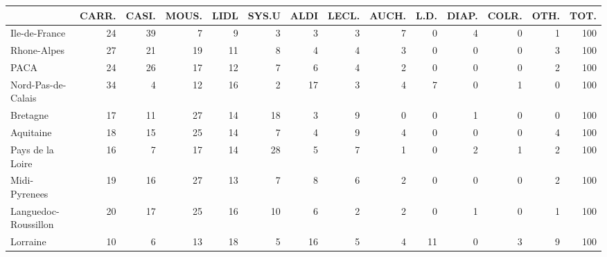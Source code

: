 \documentclass[11pt]{article}
\begin{document}
\begin{table}[H]
\begin{tabular}{lrrrrrrrrrrrrr}
\toprule
{} &      CARR. &      CASI. &      MOUS. &       LIDL &      SYS.U &       ALDI &      LECL. &      AUCH. &       L.D. &      DIAP. &      COLR. &       OTH. &       TOT. \\
\midrule
Ile-de-France        &         24 &         39 &          7 &          9 &          3 &          3 &          3 &          7 &          0 &          4 &          0 &          1 &        100 \\
Rhone-Alpes          &         27 &         21 &         19 &         11 &          8 &          4 &          4 &          3 &          0 &          0 &          0 &          3 &        100 \\
PACA                 &         24 &         26 &         17 &         12 &          7 &          6 &          4 &          2 &          0 &          0 &          0 &          2 &        100 \\
Nord-Pas-de-Calais   &         34 &          4 &         12 &         16 &          2 &         17 &          3 &          4 &          7 &          0 &          1 &          0 &        100 \\
Bretagne             &         17 &         11 &         27 &         14 &         18 &          3 &          9 &          0 &          0 &          1 &          0 &          0 &        100 \\
Aquitaine            &         18 &         15 &         25 &         14 &          7 &          4 &          9 &          4 &          0 &          0 &          0 &          4 &        100 \\
Pays de la Loire     &         16 &          7 &         17 &         14 &         28 &          5 &          7 &          1 &          0 &          2 &          1 &          2 &        100 \\
Midi-Pyrenees        &         19 &         16 &         27 &         13 &          7 &          8 &          6 &          2 &          0 &          0 &          0 &          2 &        100 \\
Languedoc-Roussillon &         20 &         17 &         25 &         16 &         10 &          6 &          2 &          2 &          0 &          1 &          0 &          1 &        100 \\
Lorraine             &         10 &          6 &         13 &         18 &          5 &         16 &          5 &          4 &         11 &          0 &          3 &          9 &        100 \\

\end{tabular}
\end{table}
\end{document}
